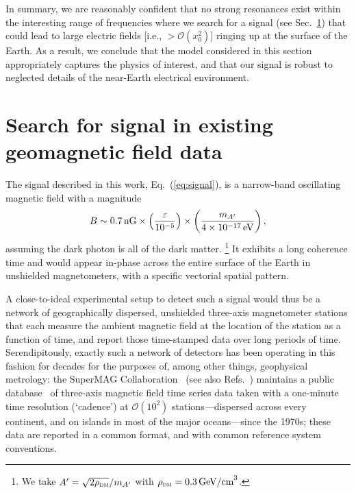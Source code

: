 \documentclass[amsmath,amssymb,aps,10pt,prd,letterpaper,nofootinbib,balancelastpage,notitlepage,superscriptaddress,twocolumn,floatfix]{revtex4-2}
\newcommand{\secref}[2][]{Sec{#1}.~\ref{#2}}		%
\renewcommand{\eqref}[2][]{Eq{#1}.~(\ref{eq:#2})}	%
\newcommand{\citeR}[2][]{Ref{#1}.~\cite{#2}}		%
\newcommand{\lb}{\ensuremath{\left}}					%
\newcommand{\rb}{\ensuremath{\right}}					%
\begin{document}
In summary, we are reasonably confident that no strong resonances exist within the interesting range of frequencies where we search for a signal (see \secref{sec:experimentalSearch}) that could lead to large electric fields [i.e., $> \mathcal{O}(x_0^2)$] ringing up at the surface of the Earth.
As a result, we conclude that the model considered in this section appropriately captures the physics of interest, and that our signal is robust to neglected details of the near-Earth electrical environment.


\section{Search for signal in existing geomagnetic field data}
\label{sec:experimentalSearch}
The signal described in this work, \eqref{signal}, is a narrow-band oscillating magnetic field with a magnitude
\begin{align}
    B \sim 0.7\,\text{nG} \times \lb( \frac{\varepsilon}{10^{-5}} \rb)\times \lb( \frac{m_{A'}}{4\times 10^{-17}\,\text{eV}} \rb), \label{eq:signalAmplitude}
\end{align}
assuming the dark photon is all of the dark matter.%
\footnote{\label{ftnt:allofDM}%
    We take $A'=\sqrt{2\rho_{\textsc{dm}}}/m_{A'}$ with $\rho_{\textsc{dm}}= 0.3\,\text{GeV/cm}^3$.
} %
It exhibits a long coherence time and would appear in-phase across the entire surface of the Earth in unshielded magnetometers, with a specific vectorial spatial pattern.

A close-to-ideal experimental setup to detect such a signal would thus be a network of geographically dispersed, unshielded three-axis magnetometer stations that each measure the ambient magnetic field at the location of the station as a function of time, and report those time-stamped data over long periods of time.
Serendipitously, exactly such a network of detectors has been operating in this fashion for decades for the purposes of, among other things, geophysical metrology: the SuperMAG Collaboration~\cite{Gjerloev:2009wsd,Gjerloev:2012sdg,SuperMAGwebsite} (see also \citeR[s]{Mann:2008wrb,Chi:2013sdn,Engebretson:1995gna,Yumoto:2001sfb,Tanskanen:2009wdg,Love:2013fbq,Lichtenberger:2013adg,1992NASCP3153..321H,INTERMAGNETmanual}) maintains a public database~\cite{SuperMAGwebsite} of three-axis magnetic field time series data taken with a one-minute time resolution (`cadence') at $\mathcal{O}(10^2)$ stations---dispersed across every continent, and on islands in most of the major oceans---since the 1970s; these data are reported in a common format, and with common reference system conventions.
\end{document}
